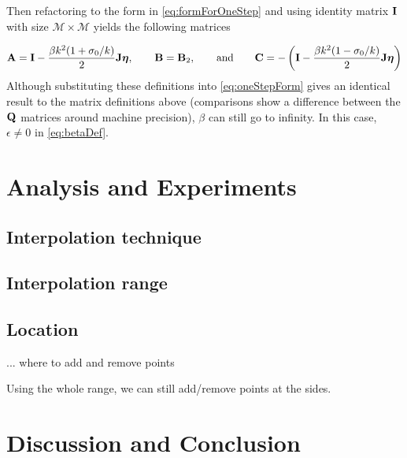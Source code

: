 Then refactoring to the form in \eqref{eq:formForOneStep} and using identity matrix $\mathbf{I}$ with size $\mathcal{M} \times \mathcal{M}$ yields the following matrices

\begin{equation}
    \mathbf{A} = \mathbf{I} - \frac{\beta k^2 (1+\sigma_0/k)}{2}\mathbf{J}\boldsymbol{\eta}, \qquad \mathbf{B} = \mathbf{B}_2, \qquad \text{and} \qquad \mathbf{C} = -\left(\mathbf{I} - \frac{\beta k^2 (1-\sigma_0/k)}{2}\mathbf{J}\boldsymbol{\eta}\right)
\end{equation}
Although substituting these definitions into \eqref{eq:oneStepForm} gives an identical result to the matrix definitions above (comparisons show a difference between the $\mathbf{Q}$ matrices around machine precision), $\beta$ can still go to infinity. In this case, $\epsilon \neq 0$ in \eqref{eq:betaDef}. 

\section{%
Analysis and Experiments}
\subsection{Interpolation technique}
\subsection{Interpolation range}
\subsection{Location}
... where to add and remove points

Using the whole range, we can still add/remove points at the sides. 

\section{Discussion and Conclusion}\label{sec:conclusion}